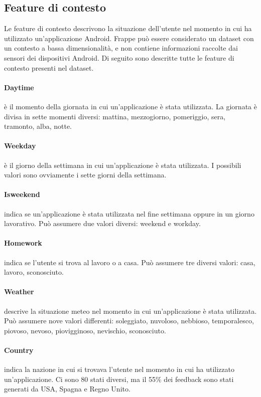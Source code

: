 \documentclass[12pt,italian]{report}
\begin{document}
\subsection{Feature di contesto}
Le feature di contesto descrivono la situazione dell'utente nel momento in cui ha utilizzato un'applicazione Android. Frappe può essere considerato un dataset con un contesto a bassa dimensionalità, e non contiene informazioni raccolte dai sensori dei dispositivi Android. Di seguito sono descritte tutte le feature di contesto presenti nel dataset.

\paragraph{Daytime} è il momento della giornata in cui un'applicazione è stata utilizzata. La giornata è divisa in sette momenti diversi: mattina, mezzogiorno, pomeriggio, sera, tramonto, alba, notte.

\paragraph{Weekday} è il giorno della settimana in cui un'applicazione è stata utilizzata. I possibili valori sono ovviamente i sette giorni della settimana.

\paragraph{Isweekend} indica se un'applicazione è stata utilizzata nel fine settimana oppure in un giorno lavorativo. Può assumere due valori diversi: weekend e workday.

\paragraph{Homework} indica se l'utente si trova al lavoro o a casa. Può assumere tre diversi valori: casa, lavoro, sconosciuto.

\paragraph{Weather} descrive la situazione meteo nel momento in cui un'applicazione è stata utilizzata. Può assumere nove valori differenti: soleggiato, nuvoloso, nebbioso, temporalesco, piovoso, nevoso, piovigginoso, nevischio, sconosciuto.

\paragraph{Country} indica la nazione in cui si trovava l'utente nel momento in cui ha utilizzato un'applicazione. Ci sono 80 stati diversi, ma il 55\% dei feedback sono stati generati da USA, Spagna e Regno Unito.
\end{document}
